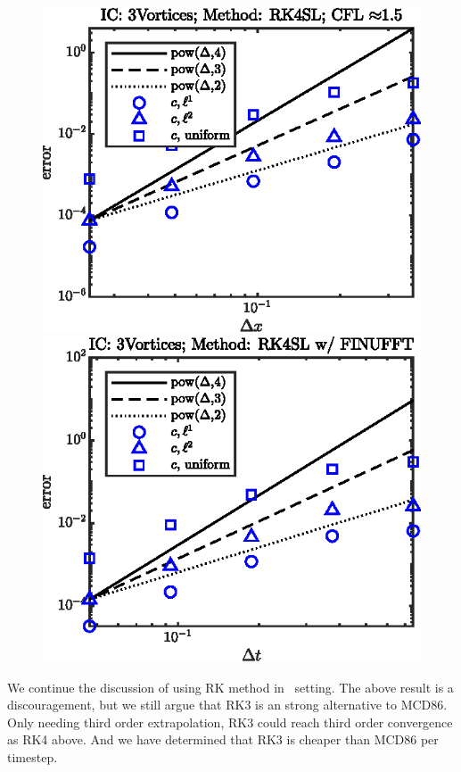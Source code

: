 \documentclass[11pt,letterpaper]{article}
\begin{document}
\begin{figure}[H]
    \includegraphics{figs/nonlin_conv_order_3Vortices_RK4SL}
    \includegraphics{figs/nonlin_conv_order_3Vortices_finu_RK4SL}
    \caption{}\label{fig:nonlin_conv_order_Taylor_RK4SL}
\end{figure}
We continue the discussion of using RK method in \sml\ setting. The above result is a discouragement, but we still argue that RK3 is an strong alternative to MCD86. Only needing third order extrapolation, RK3 could reach third order convergence as RK4 above. And we have determined that RK3 is cheaper than MCD86 per timestep.
\end{document}
